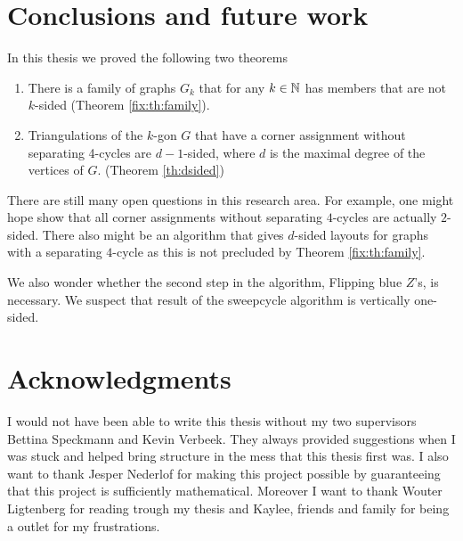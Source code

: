 
\thispagestyle{plain}
\section{Conclusions and future work}

In this thesis we proved the following two theorems

\begin{enumerate}
  \item There is a family of graphs $G_k$ that for any $k \in \mathbb{N}$ has members that are not $k$-sided (Theorem \ref{fix:th:family}).
  \item Triangulations of the $k$-gon $G$ that have a corner assignment without separating 4-cycles are $d-1$-sided, where $d$ is the maximal degree of the vertices of $G$. (Theorem \ref{th:dsided})
\end{enumerate}

There are still many open questions in this research area. For example, one might hope show that all corner assignments without separating $4$-cycles are actually $2$-sided.
There also might be an algorithm that gives $d$-sided layouts for graphs with a separating $4$-cycle as this is not precluded by Theorem \ref{fix:th:family}.

We also wonder whether the second step in the algorithm, Flipping blue $Z$'s, is necessary.
We suspect that result of the sweepcycle algorithm is vertically one-sided.


\newpage
\thispagestyle{plain}
\section*{Acknowledgments}
I would not have been able to write this thesis without my two supervisors Bettina Speckmann and Kevin Verbeek. They always provided suggestions when I was stuck and helped bring structure in the mess that this thesis first was. I also want to thank Jesper Nederlof for making this project possible by guaranteeing that this project is sufficiently mathematical.
Moreover I want to thank Wouter Ligtenberg for reading trough my thesis and Kaylee, friends and family for being a outlet for my frustrations.
